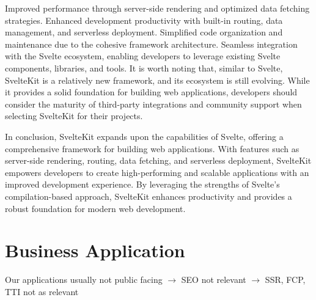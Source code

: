 Improved performance through server-side rendering and optimized data fetching strategies.
Enhanced development productivity with built-in routing, data management, and serverless deployment.
Simplified code organization and maintenance due to the cohesive framework architecture.
Seamless integration with the Svelte ecosystem, enabling developers to leverage existing Svelte components, libraries, and tools.
It is worth noting that, similar to Svelte, SvelteKit is a relatively new framework, and its ecosystem is still evolving. While it provides a solid foundation for building web applications, developers should consider the maturity of third-party integrations and community support when selecting SvelteKit for their projects.

In conclusion, SvelteKit expands upon the capabilities of Svelte, offering a comprehensive framework for building web applications. With features such as server-side rendering, routing, data fetching, and serverless deployment, SvelteKit empowers developers to create high-performing and scalable applications with an improved development experience. By leveraging the strengths of Svelte's compilation-based approach, SvelteKit enhances productivity and provides a robust foundation for modern web development.

\section{Business Application}
\label{sec:business-application}

Our applications usually not public facing $\rightarrow$ SEO not relevant $\rightarrow$ SSR, FCP, TTI not as relevant
